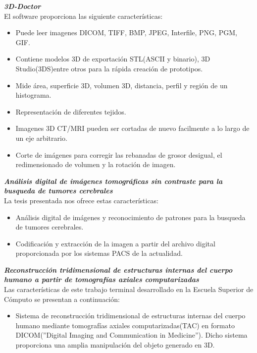 \documentclass[12pt]{report}
\begin{document}
\hfill\break
\textbf{\textit{3D-Doctor}}\cite{tridi}
\\El software proporciona las siguiente características:
\begin{itemize}
\item Puede leer imagenes DICOM, TIFF, BMP, JPEG, Interfile, PNG, PGM, GIF.
\item Contiene modelos 3D de exportación STL(ASCII y binario), 3D Studio(3DS)entre otros para la rápida creación de prototipos.
\item Mide área, superficie 3D, volumen 3D, distancia, perfil y región de un histograma.
\item Representación de diferentes tejidos.
\item Imagenes 3D CT/MRI pueden ser cortadas de nuevo facilmente a lo largo de un eje arbitrario.
\item Corte de imágenes para corregir las rebanadas de grosor desigual, el redimensionado de volumen y la rotación de imagen.
\end{itemize}

\hfill\break
\textbf{\textit{Análisis digital de imágenes tomográficas sin contraste para la busqueda de tumores cerebrales}}\cite{edgardo}
\\La tesis presentada nos ofrece estas características:
\begin{itemize}
\item Análisis digital de imágenes y reconocimiento de patrones para la busqueda de tumores cerebrales.
\item Codificación y extracción de la imagen a partir del archivo digital proporcionada por los sistemas PACS de la actualidad.
\end{itemize}


\hfill\break
\textbf{\textit{Reconstrucción tridimensional de estructuras internas del cuerpo humano a partir de tomografías axiales computarizadas}}\cite{titi}
\\Las características de este trabajo terminal desarrollado en la Escuela Superior de Cómputo se presentan a continuación:
\begin{itemize}
\item Sistema de reconstrucción tridimensional de estructuras internas del cuerpo humano mediante tomografías axiales computarizadas(TAC) en formato DICOM(''Digital Imaging and Communication in Medicine''). Dicho sistema proporciona una amplia manipulación del objeto generado en 3D.
\end{itemize}
\end{document}
